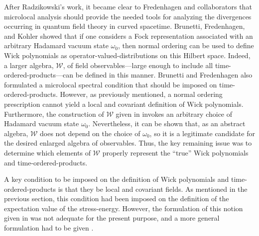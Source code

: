 \documentclass[12pt,epsf,amsfonts,amssymb]{article}
\begin{document}
After Radzikowski's work, it became clear to Fredenhagen and
collaborators that microlocal analysis should provide the needed tools
for analyzing the divergences occurring in quantum field theory in
curved spacetime. Brunetti, Fredenhagen, and Kohler \cite{bfk} showed
that if one considers a Fock representation associated with an
arbitrary Hadamard vacuum state $\omega_0$, then normal ordering can
be used to define Wick polynomials as operator-valued-distributions on
this Hilbert space. Indeed, a larger algebra, $\mathcal W$, of field
observables---large enough to include all time-ordered-products---can
be defined in this manner. Brunetti and Fredenhagen \cite{bf} also
formulated a microlocal spectral condition that should be imposed on
time-ordered-products. However, as previously mentioned, a normal
ordering prescription cannot yield a local and covariant definition of
Wick polynomials. Furthermore, the construction of $\mathcal W$ given
in \cite{bfk} invokes an arbitrary choice of Hadamard vacuum state
$\omega_0$. Nevertheless, it can be shown that, as an abstract
algebra, $\mathcal W$ does not depend on the choice of $\omega_0$, so
it is a legitimate candidate for the desired enlarged algebra of
observables. Thus, the key remaining issue was to determine which
elements of $\mathcal W$ properly represent the ``true'' Wick
polynomials and time-ordered-products.

A key condition to be imposed on the definition of Wick polynomials
and time-ordered-products is that they be local and covariant fields.
As mentioned in the previous section, this condition had been imposed
on the definition of the expectation value of the stress-energy.
However, the formulation of this notion given in \cite{w2} was not
adequate for the present purpose, and a more general formulation had
to be given \cite{hw1,bfv}.
\end{document}
